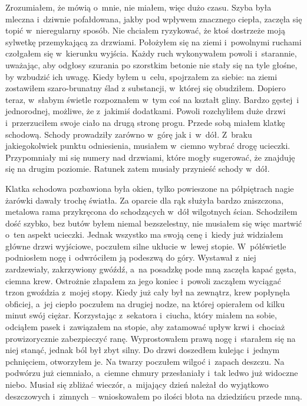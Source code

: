 Zrozumiałem, że mówią o~mnie, nie miałem, więc dużo czasu. Szyba była mleczna i~dziwnie pofałdowana, jakby pod wpływem znacznego ciepła, zaczęła się topić w~nieregularny sposób. Nie chciałem ryzykować, że ktoś dostrzeże moją sylwetkę przemykającą za drzwiami. Położyłem się na ziemi i~powolnymi ruchami czołgałem się w~kierunku wyjścia. Każdy ruch wykonywałem powoli i~starannie, uważając, aby odgłosy szurania po szorstkim betonie nie stały się na tyle głośne, by wzbudzić ich uwagę. Kiedy byłem u~celu, spojrzałem za siebie: na ziemi zostawiłem szaro-brunatny ślad z substancji, w~której się obudziłem. Dopiero teraz, w~słabym świetle rozpoznałem w~tym coś na kształt gliny. Bardzo gęstej~i jednorodnej, możliwe, że z~jakimiś dodatkami. Powoli rozchyliłem duże drzwi i~przerzuciłem swoje ciało na drugą stronę progu. Przede sobą miałem klatkę schodową. Schody prowadziły zarówno w~górę jak i~w~dół. Z~braku jakiegokolwiek punktu odniesienia, musiałem w~ciemno wybrać drogę ucieczki. Przypomniały mi się numery nad drzwiami, które mogły sugerować, że znajduję się na drugim poziomie. Ratunek zatem musiały przynieść schody w~dół.

Klatka schodowa pozbawiona była okien, tylko powieszone na półpiętrach nagie żarówki dawały trochę światła. Za oparcie dla rąk służyła bardzo zniszczona, metalowa rama przykręcona do schodzących w~dół wilgotnych ścian. Schodziłem dość szybko, bez butów byłem niemal bezszelestny, nie musiałem się więc martwić o~ten aspekt ucieczki. Jednak wszystko ma swoją cenę i~kiedy już widziałem główne drzwi wyjściowe, poczułem silne ukłucie w~lewej stopie. W~półświetle podniosłem nogę i~odwróciłem ją podeszwą do góry. Wystawał z~niej zardzewiały, zakrzywiony gwóźdź, a~na posadzkę pode mną zaczęła kapać gęsta, ciemna krew. Ostrożnie złapałem za jego koniec i~powoli zacząłem wyciągać trzon gwoździa z~mojej stopy. Kiedy już cały był na zewnątrz, krew popłynęła obficiej, a~jej ciepło poczułem na drugiej nodze, na której opierałem od kilku minut swój ciężar. Korzystając z~sekatora i~ciucha, który miałem na sobie, odciąłem pasek i~zawiązałem na stopie, aby zatamować upływ krwi i~chociaż prowizorycznie zabezpieczyć ranę. Wyprostowałem prawą nogę i~starałem się na niej stanąć, jednak ból był zbyt silny. Do drzwi doszedłem kulejąc i~jednym pchnięciem, otworzyłem je. Na twarzy poczułem wilgoć i~zapach deszczu. Na podwórzu już ciemniało, a~ciemne chmury przesłaniały i~tak ledwo już widoczne niebo. Musiał się zbliżać wieczór, a~mijający dzień należał do wyjątkowo deszczowych i~zimnych -- wnioskowałem po ilości błota na dziedzińcu przede mną.

